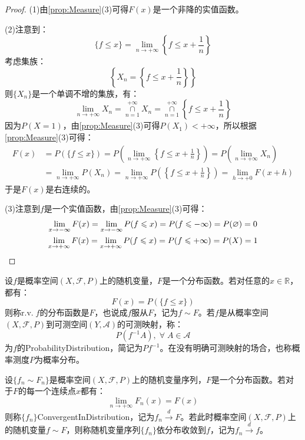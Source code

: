 \begin{proof}
	(1)由\cref{prop:Measure}(3)可得$F(x)$是一个非降的实值函数。\par
	(2)注意到：
	\begin{equation*}
		\{f\leqslant x\}=\lim_{n\to+\infty}\left\{f\leqslant x+\frac{1}{n}\right\}
	\end{equation*}
	考虑集族：
	\begin{equation*}
		\left\{X_n=\left\{f\leqslant x+\frac{1}{n}\right\}\right\}
	\end{equation*}
	则$\{X_n\}$是一个单调不增的集族，有：
	\begin{equation*}
		\lim_{n\to+\infty}X_n=\underset{n=1}{\overset{+\infty}{\cap}}X_n=\underset{n=1}{\overset{+\infty}{\cap}}\left\{f\leqslant x+\frac{1}{n}\right\}
	\end{equation*}
	因为$P(X=1)$，由\cref{prop:Measure}(3)可得$P(X_1)<+\infty$，所以根据\cref{prop:Measure}(3)可得：
	\begin{align*}
		F(x)&=P(\{f\leqslant x\})
		=P\left(\lim_{n\to+\infty}\left\{f\leqslant x+\frac{1}{n}\right\}\right)
		=P\left(\lim_{n\to+\infty}X_n\right) \\
		&=\lim_{n\to+\infty}P(X_n)
		=\lim_{n\to+\infty}P\left(\left\{f\leqslant x+\frac{1}{n}\right\}\right)
		=\lim_{h\to+0}F(x+h)
	\end{align*}
	于是$F(x)$是右连续的。\par
	(3)注意到$f$是一个实值函数，由\cref{prop:Measure}(3)可得：
	\begin{gather*}
		\lim_{x\to-\infty}F(x)=\lim_{x\to-\infty}P(f\leqslant x)=P(f\leqslant-\infty)=P(\varnothing)=0 \\
		\lim_{x\to+\infty}F(x)=\lim_{x\to+\infty}P(f\leqslant x)=P(f\leqslant+\infty)=P(X)=1\qedhere
	\end{gather*}
\end{proof}
\begin{definition}
	设$f$是概率空间$(X,\mathscr{F},P)$上的随机变量，$F$是一个分布函数。若对任意的$x\in\mathbb{R}$，都有：
	\begin{equation*}
		F(x)=P(\{f\leqslant x\})
	\end{equation*}
	则称r.v.$\;f$的分布函数是$F$，也说成$f$服从$F$，记为$f\sim F$。若$f$是从概率空间$(X,\mathscr{F},P)$到可测空间$(Y,\mathscr{A})$的可测映射，称：
	\begin{equation*}
		P(f^{-1}A),\;\forall\;A\in \mathscr{A}
	\end{equation*}
	为$f$的\gls{ProbabilityDistribution}，简记为$Pf^{-1}$。在没有明确可测映射的场合，也称概率测度$P$为概率分布。
\end{definition}
\begin{definition}
	设$\{f_n\sim F_n\}$是概率空间$(X,\mathscr{F},P)$上的随机变量序列，$F$是一个分布函数。若对于$F$的每一个连续点$x$都有：
	\begin{equation*}
		\lim_{n\to+\infty}F_n(x)=F(x)
	\end{equation*}
	则称$\{f_n\}$\gls{ConvergentInDistribution}，记为$f_n\overset{d}{\longrightarrow}F$。若此时概率空间$(X,\mathscr{F},P)$上的随机变量$f\sim F$，则称随机变量序列$\{f_n\}$依分布收敛到$f$，记为$f_n\overset{d}{\longrightarrow}f$。
\end{definition}


